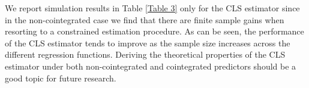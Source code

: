 \documentclass[a4paper,12pt,times,numbered,print,index]{report}
\numberwithin{equation}{section}
\begin{document}
	We report simulation results in Table \ref{Table 3} only for the CLS estimator since in the non-cointegrated case we find that there are finite sample gains when resorting to a constrained estimation procedure. As can be seen, the performance of the CLS estimator tends to improve as the sample size increases across the different regression functions. Deriving the theoretical properties of the CLS estimator under both non-cointegrated and cointegrated predictors should be a good topic for future research. 
	
	
	
\end{document}
